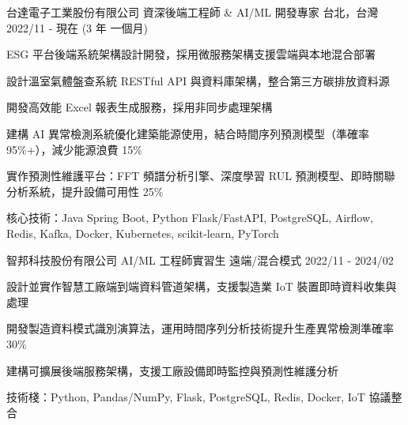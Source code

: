 
\begin{cventries}
  \cventry
    {台達電子工業股份有限公司} %
    {資深後端工程師 \& AI/ML 開發專家} %
    {台北，台灣} %
    {2022/11 - 現在 (3 年 一個月)} %
    {
     \begin{cvitems} %
        \item {ESG 平台後端系統架構設計開發，採用微服務架構支援雲端與本地混合部署}
        \item {設計溫室氣體盤查系統 RESTful API 與資料庫架構，整合第三方碳排放資料源}
        \item {開發高效能 Excel 報表生成服務，採用非同步處理架構}
        \item {建構 AI 異常檢測系統優化建築能源使用，結合時間序列預測模型（準確率 95\%+），減少能源浪費 15\%}
        \item {實作預測性維護平台：FFT 頻譜分析引擎、深度學習 RUL 預測模型、即時關聯分析系統，提升設備可用性 25\%}
        \item {核心技術：Java Spring Boot, Python Flask/FastAPI, PostgreSQL, Airflow, Redis, Kafka, Docker, Kubernetes, scikit-learn, PyTorch}
      \end{cvitems}
    }
    
  \vspace{2mm} %
  
  \cventry
    {智邦科技股份有限公司} %
    {AI/ML 工程師實習生} %
    {遠端/混合模式} %
    {2022/11 - 2024/02} %
    {
     \begin{cvitems} %
        \item {設計並實作智慧工廠端到端資料管道架構，支援製造業 IoT 裝置即時資料收集與處理}
        \item {開發製造資料模式識別演算法，運用時間序列分析技術提升生產異常檢測準確率 30\%}
        \item {建構可擴展後端服務架構，支援工廠設備即時監控與預測性維護分析}
        \item {技術棧：Python, Pandas/NumPy, Flask, PostgreSQL, Redis, Docker, IoT 協議整合}
      \end{cvitems}
    }
\end{cventries}
